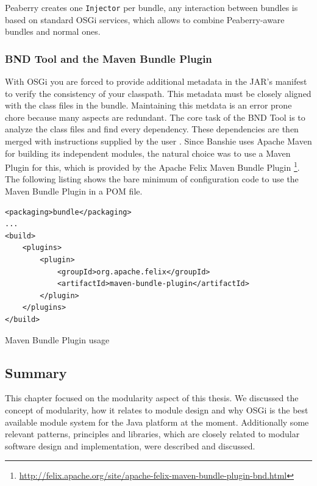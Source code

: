 Peaberry creates one \texttt{Injector} per bundle, any interaction between bundles is based on standard OSGi services, which allows to combine Peaberry-aware bundles and normal ones.

\subsubsection{BND Tool and the Maven Bundle Plugin}
With \gls{OSGi} you are forced to provide additional metadata in the JAR's manifest to verify the consistency of your classpath. This metadata must be closely aligned with the class files in the bundle. Maintaining this metdata is an error prone chore because many aspects are redundant. The core task of the BND Tool is to analyze the class files and find every dependency. These dependencies are then merged with instructions supplied by the user \cite{BND}. Since Banshie uses Apache Maven for building its independent modules, the natural choice was to use a Maven Plugin for this, which is provided by the Apache Felix Maven Bundle Plugin \footnote{\url{http://felix.apache.org/site/apache-felix-maven-bundle-plugin-bnd.html}}. The following listing shows the bare minimum of configuration code to use the Maven Bundle Plugin in a POM file.

\begin{listing}[H]
\begin{verbatim}
<packaging>bundle</packaging>
...
<build>
    <plugins>
        <plugin>
            <groupId>org.apache.felix</groupId>
            <artifactId>maven-bundle-plugin</artifactId>
        </plugin>
    </plugins>
</build>
\end{verbatim}
\caption{Maven Bundle Plugin usage}
\end{listing}

\subsection{Summary}
This chapter focused on the modularity aspect of this thesis. We discussed the concept of modularity, how it relates to module design and why \gls{OSGi} is the best available module system for the Java platform at the moment. Additionally some relevant patterns, principles and libraries, which are closely related to modular software design and implementation, were described and discussed. 
